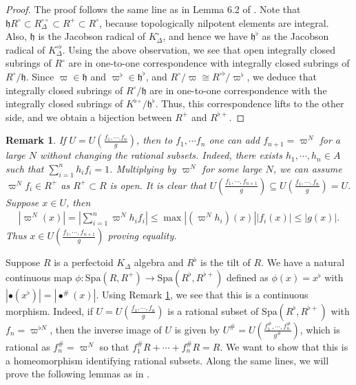 \documentclass[12pts,a4paper]{amsart}
\newtheorem{remark}[proposition]{Remark}
\begin{document}
\begin{proof}
    The proof follows the same line as in Lemma 6.2 of \cite{Sch}. Note that $\mathfrak{h}R^\circ \subset R^{\circ\circ}_\Delta \subset R^+ \subset R^\circ$, because topologically nilpotent elements are integral. Also, $\mathfrak{h}$ is the Jacobson radical of $K^\circ_\Delta$, and hence we have $\mathfrak{h}^\flat$ as the Jacobson radical of $K^{\circ\flat}_\Delta$. Using the above observation, we see that open integrally closed subrings of $R^\circ$ are in one-to-one correspondence with integrally closed subrings of $R^\circ/\mathfrak{h}$. Since $\varpi \in \mathfrak{h}$ and $\varpi^\flat \in \mathfrak{h}^\flat$, and $R^\circ/\varpi \cong R^{\circ\flat}/\varpi^\flat$, we deduce that integrally closed subrings of $R^\circ/\mathfrak{h}$ are in one-to-one correspondence with the integrally closed subrings of $K^{\flat\circ}/\mathfrak{h}^\flat$. Thus, this correspondence lifts to the other side, and we obtain a bijection between $R^+$ and $R^{\flat+}$.
\end{proof}

\begin{remark}\label{rationalsubsetmodification}
    If $U=U\left(\frac{f_1,\cdots.f_n}{g}\right)$, then to $f_1,\cdots f_n$ one can add $f_{n+1}=\varpi^N$ for a large $N$ without changing the rational subsets. Indeed, there exists $h_1,\cdots,h_n\in A$ such that $\sum\limits_{i=1}^n h_if_i=1$. Multiplying by $\varpi^N$ for some large $N$, we can assume $\varpi^N f_i\in R^+$ as $R^+\subset R$ is open. It is clear that $U\left(\frac{f_1,\cdots,f_{n+1}}{g}\right)\subseteq U\left(\frac{f_1,\cdots,f_n}{g}\right)=U$. Suppose $x\in U$, then 
    \begin{align*}
        |\varpi^N(x)|=\left|\sum\limits_{i=1}^n\varpi^N h_if_i\right|\leq \max|(\varpi^N h_i)(x)||f_i(x)|\leq |g(x)|.
    \end{align*}
    Thus $x\in U\left(\frac{f_1,\cdots,f_{n+1}}{g}\right)$ proving equality.
\end{remark}

Suppose $R$ is a perfectoid $K_\Delta$ algebra and $R^\flat$ is the tilt of $R$. We have a natural continuous map $\phi: \mathrm{Spa}(R, R^+) \to \mathrm{Spa}(R^\flat, R^{\flat+})$ defined as $\phi(x) = x^\flat$ with $|\bullet(x^\flat)| = |\bullet^\#(x)|$. Using Remark \ref{rationalsubsetmodification}, we see that this is a continuous morphism. Indeed, if $U = U\left(\frac{f_1, \cdots, f_n}{g}\right)$ is a rational subset of $\mathrm{Spa}(R^\flat, R^{\flat+})$ with $f_n = \varpi^{\flat N}$, then the inverse image of $U$ is given by $U^\# = U\left(\frac{f^\#_1, \cdots, f^\#_n}{g^\#}\right)$, which is rational as $f^\#_n = \varpi^N$ so that $f^\#_1R + \cdots + f^\#_nR = R$. We want to show that this is a homeomorphism identifying rational subsets. Along the same lines, we will prove the following lemmas as in \cite{Sch}.
\end{document}
